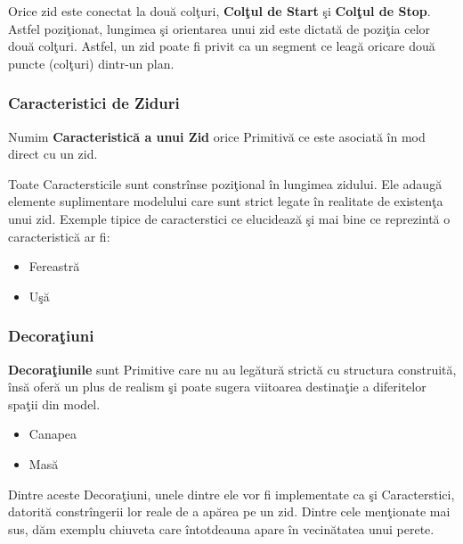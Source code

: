Orice zid este conectat la două colţuri, \textbf{Colţul de Start} şi 
\textbf{Colţul de Stop}. Astfel poziţionat, lungimea şi orientarea unui zid 
este dictată de poziţia celor două colţuri. Astfel, un zid poate fi privit ca 
un segment ce leagă oricare două puncte (colţuri) dintr-un plan.

\subsubsection{Caracteristici de Ziduri}
\label{section:features}

\begin{definition}
\label{define:feature}
Numim \textbf{Caracteristică a unui Zid} orice Primitivă ce este asociată în 
mod direct cu un zid.
\end{definition}

Toate Caractersticile sunt constrînse poziţional în lungimea zidului. Ele 
adaugă elemente suplimentare modelului care sunt strict legate în realitate de 
existenţa unui zid. Exemple tipice de caracterstici ce elucidează şi mai bine 
ce reprezintă o caracteristică ar fi:

\begin{itemize}
  \item Fereastră
  \item Uşă
\end{itemize}
  
\subsubsection{Decoraţiuni}
  
\begin{definition}
\label{define:decoration}
\textbf{Decoraţiunile} sunt Primitive care nu au legătură strictă cu structura 
construită, însă oferă un plus de realism şi poate sugera viitoarea destinaţie 
a diferitelor spaţii din model.
\end{definition}
  
\begin{itemize}
  \item Canapea
  \item Masă
\end{itemize}

Dintre aceste Decoraţiuni, unele dintre ele vor fi implementate ca şi 
Caracterstici, datorită constrîngerii lor reale de a apărea pe un zid. Dintre 
cele menţionate mai sus, dăm exemplu chiuveta care întotdeauna apare în 
vecinătatea unui perete.

